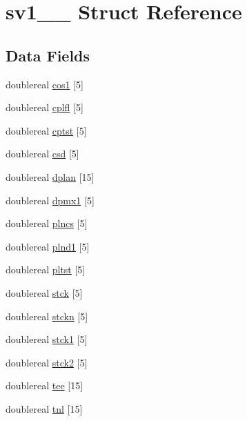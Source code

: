 \hypertarget{structsv1__1__}{}\section{sv1\+\_\+\_\+ Struct Reference}
\label{structsv1__1__}
\subsection*{Data Fields}
\begin{DoxyCompactItemize}
\item 
doublereal \hyperlink{structsv1__1___a8d98983c78a5422a4164dfb90a9fc6e2}{cos1} \mbox{[}5\mbox{]}
\item 
doublereal \hyperlink{structsv1__1___ab57e491c3efa057480f59242243ca49f}{cplfl} \mbox{[}5\mbox{]}
\item 
doublereal \hyperlink{structsv1__1___a3a31d772830bb00996f180502c536904}{cptst} \mbox{[}5\mbox{]}
\item 
doublereal \hyperlink{structsv1__1___a19786e803648b8b095ffdb4f402ab471}{csd} \mbox{[}5\mbox{]}
\item 
doublereal \hyperlink{structsv1__1___a272b00b37c68e67ac5b6aadff856b3d8}{dplan} \mbox{[}15\mbox{]}
\item 
doublereal \hyperlink{structsv1__1___ae07d5c5e8ceb1db83d0ac71deeaa16c8}{dpmx1} \mbox{[}5\mbox{]}
\item 
doublereal \hyperlink{structsv1__1___a7c117b224eaaa69300447d45743d15b9}{plncs} \mbox{[}5\mbox{]}
\item 
doublereal \hyperlink{structsv1__1___ab7fb40d740c50594ae1c873101910edc}{plnd1} \mbox{[}5\mbox{]}
\item 
doublereal \hyperlink{structsv1__1___a9c7976d1c56440d7e41a53e8b6661f09}{pltst} \mbox{[}5\mbox{]}
\item 
doublereal \hyperlink{structsv1__1___a64ba4dad196327837e4966ef1320d033}{stck} \mbox{[}5\mbox{]}
\item 
doublereal \hyperlink{structsv1__1___afdd9e5ab969d78c0cfaa0dadac262b47}{stckn} \mbox{[}5\mbox{]}
\item 
doublereal \hyperlink{structsv1__1___a028c473e10246e1ce17ab84ac9ac21ff}{stck1} \mbox{[}5\mbox{]}
\item 
doublereal \hyperlink{structsv1__1___a6b0411c8452c04c7a3ab1f98f6099c71}{stck2} \mbox{[}5\mbox{]}
\item 
doublereal \hyperlink{structsv1__1___af3678e9944777202322f3e7b281cd2e2}{tee} \mbox{[}15\mbox{]}
\item 
doublereal \hyperlink{structsv1__1___a89c3c473aa8506badf51b9ee838a903c}{tnl} \mbox{[}15\mbox{]}
\end{DoxyCompactItemize}


